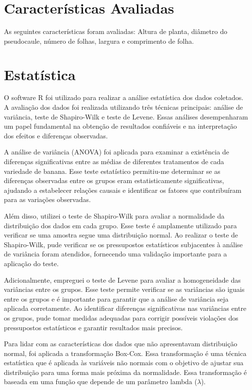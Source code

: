 \section{Características Avaliadas}
As seguintes características foram avaliadas: Altura de planta, diâmetro do pseudocaule, número de folhas, largura e comprimento de folha.

\section{Estatística}
O software R foi utilizado para realizar a análise estatística dos dados coletados. A avaliação dos dados foi realizada utilizando três técnicas principais: análise de variância, teste de Shapiro-Wilk e teste de Levene. Essas análises desempenharam um papel fundamental na obtenção de resultados confiáveis e na interpretação dos efeitos e diferenças observadas.

A análise de variância (ANOVA) foi aplicada para examinar a existência de diferenças significativas entre as médias de diferentes tratamentos de cada variedade de banana. Esse teste estatístico permitiu-me determinar se as diferenças observadas entre os grupos eram estatisticamente significativas, ajudando a estabelecer relações causais e identificar os fatores que contribuíram para as variações observadas.

Além disso, utilizei o teste de Shapiro-Wilk para avaliar a normalidade da distribuição dos dados em cada grupo. Esse teste é amplamente utilizado para verificar se uma amostra segue uma distribuição normal. Ao realizar o teste de Shapiro-Wilk, pude verificar se os pressupostos estatísticos subjacentes à análise de variância foram atendidos, fornecendo uma validação importante para a aplicação do teste.

Adicionalmente, empreguei o teste de Levene para avaliar a homogeneidade das variâncias entre os grupos. Esse teste permite verificar se as variâncias são iguais entre os grupos e é importante para garantir que a análise de variância seja aplicada corretamente. Ao identificar diferenças significativas nas variâncias entre os grupos, pude tomar medidas adequadas para corrigir possíveis violações dos pressupostos estatísticos e garantir resultados mais precisos.

Para lidar com as características dos dados que não apresentavam distribuição normal, foi aplicada a transformação Box-Cox. Essa transformação é uma técnica estatística que é aplicada às variáveis não normais com o objetivo de ajustar sua distribuição para uma forma mais próxima da normalidade. Essa transformação é baseada em uma função que depende de um parâmetro lambda ($\lambda$).